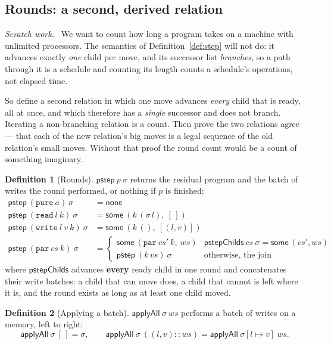 \documentclass[11pt,a4paper]{article}
\theoremstyle{definition}
\newtheorem{definition}{Definition}
\theoremstyle{plain}
\theoremstyle{remark}
\newenvironment{scratch}{\par\medskip\noindent\textit{Scratch work.}\ \ignorespaces}{\par\medskip}
\newcommand{\st}{\sigma}
\newcommand{\pstep}{\mathsf{pstep}}
\newcommand{\upd}[3]{#1[#2 \mapsto #3]}
\begin{document}
\subsection{Rounds: a second, derived relation}\label{sec:cost:rounds}

\begin{scratch}
We want to count how long a program takes on a machine with unlimited processors. The
semantics of Definition~\ref{def:step} will not do: it advances exactly \emph{one} child per
move, and its successor list \emph{branches}, so a path through it is a schedule and counting
its length counts a schedule's operations, not elapsed time.

So define a second relation in which one move advances \emph{every} child that is ready, all
at once, and which therefore has a \emph{single} successor and does not branch. Iterating a
non-branching relation is a count. Then prove the two relations agree --- that each of the new
relation's big moves is a legal sequence of the old relation's small moves. Without that
proof the round count would be a count of something imaginary.
\end{scratch}

\begin{definition}[Rounds]\label{def:pstep}
$\pstep\ p\ \st$ returns the residual program and the batch of writes the round performed, or
nothing if $p$ is finished:
\begin{align*}
  \pstep\ (\texttt{pure}\ a)\ \st &= \mathsf{none} \\
  \pstep\ (\texttt{read}\ l\ k)\ \st &= \mathsf{some}\ (k\,(\st\,l),\ [\,]) \\
  \pstep\ (\texttt{write}\ l\ v\ k)\ \st &= \mathsf{some}\ (k\,(),\ [(l,v)]) \\
  \pstep\ (\texttt{par}\ cs\ k)\ \st &=
    \begin{cases}
      \mathsf{some}\ (\texttt{par}\ cs'\ k,\ ws) & \pstep\mathsf{Childs}\ cs\ \st = \mathsf{some}\ (cs', ws) \\
      \pstep\ (k\,vs)\ \st & \text{otherwise, the join}
    \end{cases}
\end{align*}
where $\pstep\mathsf{Childs}$ advances \textbf{every} ready child in one round and concatenates
their write batches: a child that can move does, a child that cannot is left where it is, and
the round exists as long as at least one child moved.
\end{definition}

\begin{definition}[Applying a batch]\label{def:applyall}
$\mathsf{applyAll}\ \st\ ws$ performs a batch of writes on a memory, left to right:
\[
  \mathsf{applyAll}\ \st\ [\,] = \st, \qquad
  \mathsf{applyAll}\ \st\ ((l,v) :: ws) = \mathsf{applyAll}\ \upd{\st}{l}{v}\ ws .
\]
\end{definition}
\end{document}
